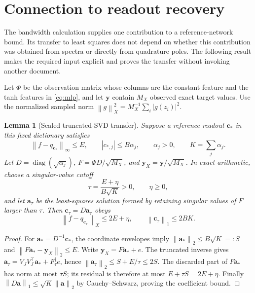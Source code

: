 \documentclass[11pt]{article}
\newtheorem{lemma}[theorem]{Lemma}
\theoremstyle{definition}\newtheorem{definition}[theorem]{Definition}
\theoremstyle{remark}\newtheorem{remark}[theorem]{Remark}
\numberwithin{equation}{section}
\DeclareMathOperator{\diag}{diag}
\newcommand{\norm}[1]{\left\lVert#1\right\rVert}
\begin{document}
\section{Connection to readout recovery}
\label{sec:recovery}
The bandwidth calculation supplies one contribution to a reference-network bound. Its transfer to least squares does not depend on whether this contribution was obtained from spectra or directly from quadrature poles. The following result makes the required input explicit and proves the transfer without invoking another document.

Let $\Phi$ be the observation matrix whose columns are the constant feature and the tanh features in \eqref{eq:mlp}, and let $\mathbf y$ contain $M_X$ observed exact target values. Use the normalized sampled norm
$\norm g_X^2=M_X^{-1}\sum_i|g(z_i)|^2$.

\begin{lemma}[Scaled truncated-SVD transfer]
\label{lem:transfer}
Suppose a reference readout $\mathbf c_*$ in this fixed dictionary satisfies
\begin{equation}
 \norm{f-q_{\mathbf c_*}}_\infty\le E,\qquad
 |c_{*,j}|\le B\alpha_j,\qquad \alpha_j>0,\qquad K=\sum_j\alpha_j.
 \label{eq:transfer-input}
\end{equation}
Let $D=\diag(\sqrt{\alpha_j})$, $F=\Phi D/\sqrt{M_X}$, and $\mathbf y_X=\mathbf y/\sqrt{M_X}$. In exact arithmetic, choose a singular-value cutoff
\[
 \tau=\frac{E+\eta}{B\sqrt K}>0,\qquad \eta\ge0,
\]
and let $\mathbf a_\tau$ be the least-squares solution formed by retaining singular values of $F$ larger than $\tau$. Then $\mathbf c_\tau=D\mathbf a_\tau$ obeys
\begin{equation}
 \boxed{\norm{f-q_{\mathbf c_\tau}}_X\le2E+\eta,
 \qquad \norm{\mathbf c_\tau}_1\le2BK.}
 \label{eq:transfer}
\end{equation}
\end{lemma}
\begin{proof}
For $\mathbf a_*=D^{-1}\mathbf c_*$, the coordinate envelopes imply
$\norm{\mathbf a_*}_2\le B\sqrt K=:S$ and
$\norm{F\mathbf a_*-\mathbf y_X}_2\le E$.
Write $\mathbf y_X=F\mathbf a_*+e$. The truncated inverse gives
$\mathbf a_\tau=V_JV_J^\top\mathbf a_*+F_\tau^\dagger e$, hence
$\norm{\mathbf a_\tau}_2\le S+E/\tau\le2S$.
The discarded part of $F\mathbf a_*$ has norm at most $\tau S$; its residual is therefore at most $E+\tau S=2E+\eta$.
Finally $\norm{D\mathbf a}_1\le\sqrt K\norm{\mathbf a}_2$ by Cauchy--Schwarz, proving the coefficient bound.
\end{proof}
\end{document}

